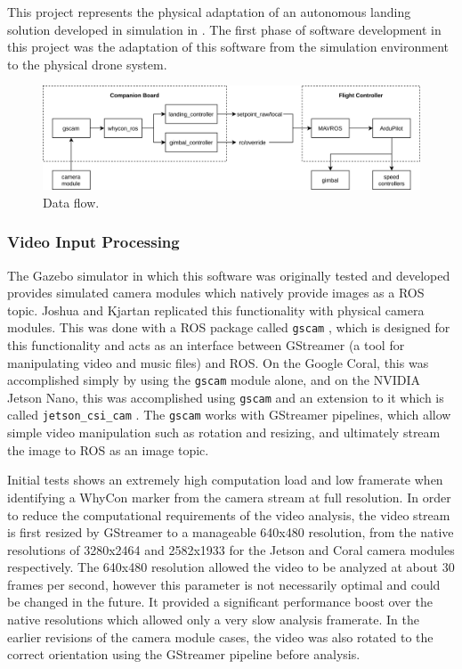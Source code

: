 This project represents the physical adaptation of an autonomous landing solution developed in simulation in \cite{AL_thesis}. The first phase of software development in this project was the adaptation of this software from the simulation environment to the physical drone system.

\begin{figure}
    \centering
    \includegraphics[width=\textwidth]{images/data_flow.png}
    \caption{Data flow.}
    \label{fig:data_flow}
\end{figure}

\subsubsection{Video Input Processing}

The Gazebo simulator in which this software was originally tested and developed provides simulated camera modules which natively provide images as a ROS topic. Joshua and Kjartan replicated this functionality with physical camera modules. This was done with a ROS package called \texttt{gscam} \cite{gscam_github}, which is designed for this functionality and acts as an interface between GStreamer (a tool for manipulating video and music files) \cite{gstreamer_website} and ROS. On the Google Coral, this was accomplished simply by using the \texttt{gscam} module alone, and on the NVIDIA Jetson Nano, this was accomplished using \texttt{gscam} and an extension to it which is called \texttt{jetson\_csi\_cam} \cite{jetson_csi_cam_github}. The \texttt{gscam} works with GStreamer pipelines, which allow simple video manipulation such as rotation and resizing, and ultimately stream the image to ROS as an image topic.

Initial tests shows an extremely high computation load and low framerate when identifying a WhyCon marker from the camera stream at full resolution. In order to reduce the computational requirements of the video analysis, the video stream is first resized by GStreamer to a manageable 640x480 resolution, from the native resolutions of 3280x2464 and 2582x1933 for the Jetson and Coral camera modules respectively. The 640x480 resolution allowed the video to be analyzed at about 30 frames per second, however this parameter is not necessarily optimal and could be changed in the future. It provided a significant performance boost over the native resolutions which allowed only a very slow analysis framerate. In the earlier revisions of the camera module cases, the video was also rotated to the correct orientation using the GStreamer pipeline before analysis.

